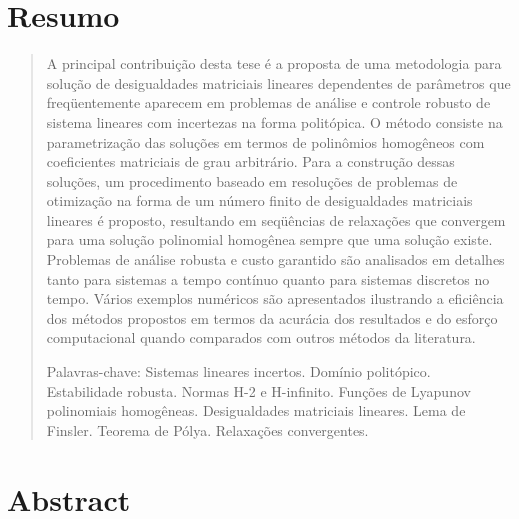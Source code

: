 \chapter*{Resumo}


\begin{quotation}
\noindent A principal contribuição desta tese é a proposta de uma
metodologia para solução de desigualdades matriciais lineares dependentes de parâmetros que
freqüentemente aparecem em problemas de análise e controle robusto
de sistema lineares com incertezas na forma politópica. O método consiste na parametrização
das soluções em termos de polinômios homogêneos com coeficientes matriciais de grau
arbitrário. Para a construção dessas soluções, um procedimento baseado em resoluções de
problemas de otimização na forma de um número finito de desigualdades matriciais lineares é
proposto, resultando em seqüências de
relaxações que convergem para uma solução polinomial homogênea sempre que uma solução
existe. Problemas de análise
robusta e custo garantido são analisados em detalhes
tanto para sistemas a tempo contínuo quanto para sistemas
discretos no tempo. Vários exemplos numéricos são apresentados
ilustrando a eficiência dos métodos propostos em termos da
acurácia dos resultados e do esforço computacional quando comparados
com outros métodos da literatura.

\vspace*{0.5cm}

\noindent Palavras-chave: Sistemas lineares incertos. Domínio politópico. Estabilidade robusta. Normas
H-2 e H-infinito. Funções de Lyapunov polinomiais homogêneas. Desigualdades matriciais lineares.
Lema de Finsler. Teorema de Pólya. Relaxações convergentes.

\end{quotation}


\chapter*{Abstract}


